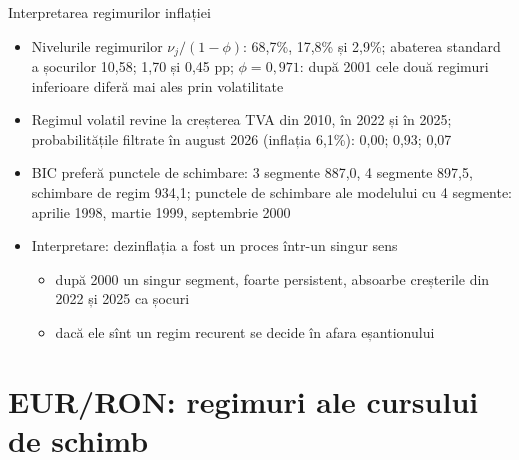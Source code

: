 \begin{frame}{Interpretarea regimurilor inflației}
\itemsize{\small}
\begin{itemize}
    \item Nivelurile regimurilor $\nu_j/(1 - \phi)$: 68{,}7\%, 17{,}8\% și 2{,}9\%; abaterea standard a șocurilor 10{,}58; 1{,}70 și 0{,}45 pp; $\phi = 0{,}971$: după 2001 cele două regimuri inferioare diferă mai ales prin volatilitate
    \item Regimul volatil revine la creșterea TVA din 2010, în 2022 și în 2025; probabilitățile filtrate în august 2026 (inflația 6{,}1\%): 0{,}00; 0{,}93; 0{,}07
    \item BIC preferă punctele de schimbare: 3 segmente 887{,}0, 4 segmente 897{,}5, schimbare de regim 934{,}1; punctele de schimbare ale modelului cu 4 segmente: aprilie 1998, martie 1999, septembrie 2000
    \item Interpretare: dezinflația a fost un proces într-un singur sens
    \begin{itemize}
        \item după 2000 un singur segment, foarte persistent, absoarbe creșterile din 2022 și 2025 ca șocuri
        \item dacă ele sînt un regim recurent se decide în afara eșantionului
    \end{itemize}
\end{itemize}
\end{frame}


\section{EUR/RON: regimuri ale cursului de schimb}

